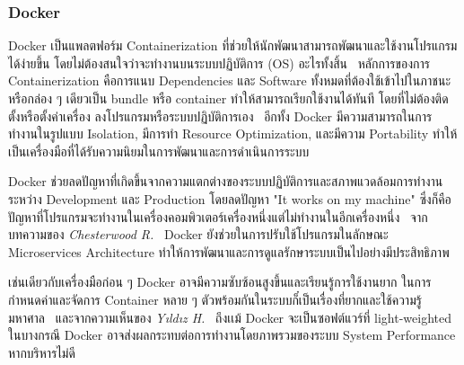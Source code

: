 \documentclass[12pt,oneside,openright,a4paper]{cpe-thai-project}
\begin{document}
        \subsubsection{Docker}
            \begin{flushleft}
                Docker เป็นแพลตฟอร์ม Containerization ที่ช่วยให้นักพัฒนาสามารถพัฒนาและใช้งานโปรแกรมได้ง่ายขึ้น โดยไม่ต้องสนใจว่าจะทำงานบนระบบปฏิบัติการ (OS) อะไรทั้งสิ้น~\cite{docker} หลักการของการ Containerization คือการแนบ Dependencies และ Software ทั้งหมดที่ต้องใช้เข้าไปในภาชนะหรือกล่อง ๆ เดียวเป็น bundle หรือ container ทำให้สามารถเรียกใช้งานได้ทันที โดยที่ไม่ต้องติดตั้งหรือตั้งค่าเครื่อง ลงโปรแกรมหรือระบบปฏิบัติการเอง~\cite{docker, yıldız23docker} อีกทั้ง Docker มีความสามารถในการทำงานในรูปแบบ Isolation, มีการทำ Resource Optimization, และมีความ Portability ทำให้เป็นเครื่องมือที่ได้รับความนิยมในการพัฒนาและการดำเนินการระบบ~\cite{yıldız23docker}
            \end{flushleft}
            \begin{flushleft}
                Docker ช่วยลดปัญหาที่เกิดขึ้นจากความแตกต่างของระบบปฏิบัติการและสภาพแวดล้อมการทำงานระหว่าง Development และ Production โดยลดปัญหา "It works on my machine" ซึ่งก็คือปัญหาที่โปรแกรมจะทำงานในเครื่องคอมพิวเตอร์เครื่องหนึ่งแต่ไม่ทำงานในอีกเครื่องหนึ่ง~\cite{yıldız23docker} จากบทความของ \textit{Chesterwood R.}~\cite{chesterwood21microservice} Docker ยังช่วยในการปรับใช้โปรแกรมในลักษณะ Microservices Architecture ทำให้การพัฒนาและการดูแลรักษาระบบเป็นไปอย่างมีประสิทธิภาพ
            \end{flushleft}
            \begin{flushleft}
                เช่นเดียวกับเครื่องมือก่อน ๆ Docker อาจมีความซับซ้อนสูงขึ้นและเรียนรู้การใช้งานยาก ในการกำหนดค่าและจัดการ Container หลาย ๆ ตัวพร้อมกันในระบบก็๋เป็นเรื่องที่ยากและใช้ความรู้มหาศาล~\cite{dockerdoc} และจากความเห็นของ \textit{Yıldız H.}~\cite{yıldız23docker} ถึงเเม้ Docker จะเป็นซอฟต์แวร์ที่ light-weighted ในบางกรณี Docker อาจส่งผลกระทบต่อการทำงานโดยภาพรวมของระบบ System Performance หากบริหารไม่ดี
            \end{flushleft}
\end{document}
